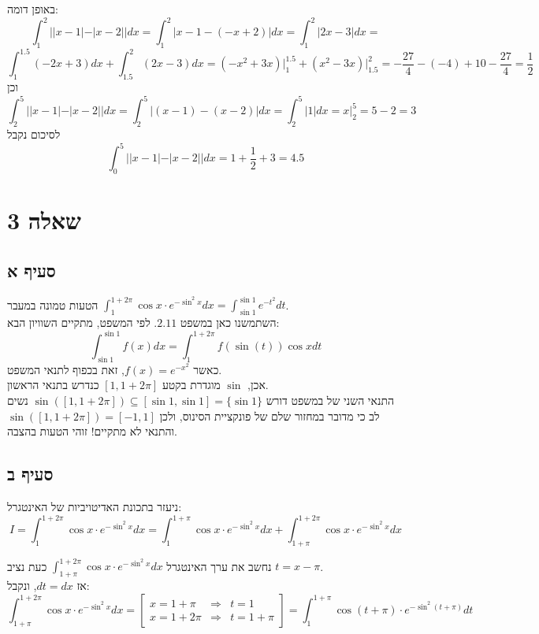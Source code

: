\documentclass{article}
\begin{document}
באופן דומה: \[
    \int_1^2 ||x-1|-|x-2||dx =
    \int_1^2 |x-1-(-x+2)|dx =
    \int_1^2 |2x-3|dx =
\]
\[
    \int_1^{1.5} (-2x+3)dx + \int_{1.5}^2 (2x-3)dx =
    (-x^2+3x)\bigg|_1^{1.5} + (x^2-3x)\bigg|_{1.5}^2 =
    -\frac{27}{4} - (-4) + 10 - \frac{27}{4} =
    \frac{1}{2}
\]
וכן \[
    \int_2^5 ||x-1|-|x-2||dx =
    \int_2^5 |(x-1)-(x-2)|dx =
    \int_2^5 |1|dx =
    x\bigg|_2^5 =
    5 - 2 = 3
\]
לסיכום נקבל \[
    \int_0^5 ||x-1|-|x-2||dx =
    1 + \frac{1}{2} + 3 =
    4.5
\]

\pagebreak

\section*{שאלה 3}

\subsection*{סעיף א}

הטעות טמונה במעבר
$\int_1^{1+2\pi}\cos x \cdot e^{-\sin^2x}dx =
    \int_{\sin 1}^{\sin 1}e^{-t^2}dt$. \\
השתמשנו כאן במשפט $2.11$. לפי המשפט, מתקיים השוויון הבא:
\[
    \int_{\sin 1}^{\sin 1}f(x)dx=\int_1^{1+2\pi} f(\sin(t)) \cos x dt
\]
כאשר $f(x) = e^{-x^2}$,
זאת בכפוף לתנאי המשפט. \\
אכן, $\sin$
מוגדרת בקטע $[1, 1+2\pi]$
כנדרש בתנאי הראשון. \\
התנאי השני של במשפט דורש $\sin([1, 1+2\pi])\subseteq [\sin 1, \sin 1] = \{\sin 1\}$
נשים לב כי מדובר במחזור שלם של פונקציית הסינוס, ולכן $\sin([1, 1+2\pi])=[-1,1]$
והתנאי לא מתקיים! זוהי הטעות בהצבה.

\subsection*{סעיף ב}

ניעזר בתכונת האדיטויביות של האינטגרל:
\[
    I=
    \int_1^{1+2\pi}\cos x \cdot e^{-\sin^2x}dx =
    \int_1^{1+\pi}\cos x \cdot e^{-\sin^2x}dx +
    \int_{1+\pi}^{1+2\pi}\cos x \cdot e^{-\sin^2x}dx
\]

נחשב את ערך האינטגרל $\int_{1+\pi}^{1+2\pi}\cos x \cdot e^{-\sin^2x}dx$
כעת נציב $t=x-\pi$. \\
אז $dt=dx$, ונקבל:
\[
    \int_{1+\pi}^{1+2\pi}\cos x \cdot e^{-\sin^2x}dx =
    \begin{bmatrix}
        x = 1 + \pi  & \Rightarrow & t =  1      \\
        x = 1 + 2\pi & \Rightarrow & t = 1 + \pi
    \end{bmatrix} =
    \int_1^{1+\pi} \cos (t+\pi) \cdot e^{-\sin^2(t+\pi)}dt
\]
\end{document}
